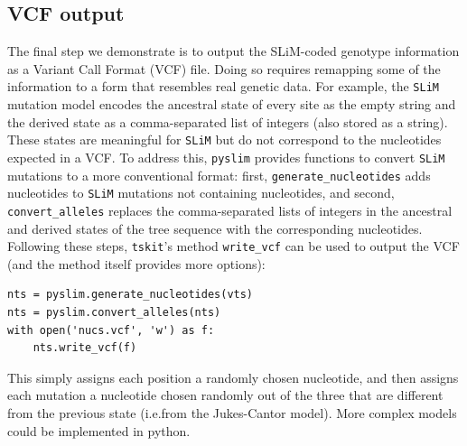 \documentclass[12pt]{article}
\newcommand{\tskit}[0]{\texttt{tskit}\xspace}
\newcommand{\slim}[0]{\texttt{SLiM}\xspace}
\newcommand{\pyslim}[0]{\texttt{pyslim}\xspace}
\newcommand*{\ie}{i.e.\xcomma}
\begin{document}
\subsection*{VCF output}
The final step we demonstrate is to output the SLiM-coded genotype information as a Variant Call Format (VCF) file.
Doing so requires remapping some of the information to a form that resembles real genetic data.
For example, the \slim mutation model encodes the ancestral state of every site as the empty string and the derived state
as a comma-separated list of integers (also stored as a string).
These states are meaningful for \slim but do not correspond to the nucleotides expected in a VCF.
To address this, \pyslim provides functions to convert \slim mutations to a more conventional format:
first, \verb|generate_nucleotides| adds nucleotides to \slim mutations not containing nucleotides,
and second, \verb|convert_alleles| replaces the comma-separated lists of integers in the ancestral and derived states of the tree sequence
with the corresponding nucleotides.
Following these steps, \tskit's method \verb|write_vcf| can be used to output the VCF
(and the method itself provides more options):
\begin{verbatim}
nts = pyslim.generate_nucleotides(vts)
nts = pyslim.convert_alleles(nts)
with open('nucs.vcf', 'w') as f:
    nts.write_vcf(f)
\end{verbatim}
This simply assigns each position a randomly chosen nucleotide,
and then assigns each mutation a nucleotide chosen randomly out of the three that are different
from the previous state (\ie from the Jukes-Cantor model).
More complex models could be implemented in python.

\end{document}
